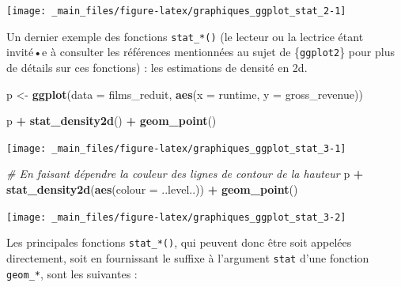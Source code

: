 \documentclass[
  11pt,
]{book}
\newenvironment{Shaded}{\begin{snugshade}}{\end{snugshade}}
\newcommand{\CommentTok}[1]{\textcolor[rgb]{0.56,0.35,0.01}{\textit{#1}}}
\newcommand{\DataTypeTok}[1]{\textcolor[rgb]{0.13,0.29,0.53}{#1}}
\newcommand{\KeywordTok}[1]{\textcolor[rgb]{0.13,0.29,0.53}{\textbf{#1}}}
\newcommand{\NormalTok}[1]{#1}
\newcommand{\OperatorTok}[1]{\textcolor[rgb]{0.81,0.36,0.00}{\textbf{#1}}}
\newcommand{\StringTok}[1]{\textcolor[rgb]{0.31,0.60,0.02}{#1}}
\numberwithin{equation}{section}
\numberwithin{countremarque}{section}
\begin{document}
\begin{center}\texttt{[image: \_main\_files/figure-latex/graphiques\_ggplot\_stat\_2-1]} \end{center}

Un dernier exemple des fonctions \texttt{stat\_*()} (le lecteur ou la lectrice étant invité•e à consulter les références mentionnées au sujet de \{\texttt{ggplot2}\} pour plus de détails sur ces fonctions) : les estimations de densité en 2d.

\begin{Shaded}
\begin{Highlighting}[]
\NormalTok{p \textless{}{-}}\StringTok{ }\KeywordTok{ggplot}\NormalTok{(}\DataTypeTok{data =}\NormalTok{ films\_reduit, }\KeywordTok{aes}\NormalTok{(}\DataTypeTok{x =}\NormalTok{ runtime, }\DataTypeTok{y =}\NormalTok{ gross\_revenue))}

\NormalTok{p }\OperatorTok{+}\StringTok{ }\KeywordTok{stat\_density2d}\NormalTok{() }\OperatorTok{+}\StringTok{ }\KeywordTok{geom\_point}\NormalTok{()}
\end{Highlighting}
\end{Shaded}

\begin{center}\texttt{[image: \_main\_files/figure-latex/graphiques\_ggplot\_stat\_3-1]} \end{center}

\begin{Shaded}
\begin{Highlighting}[]
\CommentTok{\# En faisant dépendre la couleur des lignes de contour de la hauteur}
\NormalTok{p }\OperatorTok{+}\StringTok{ }\KeywordTok{stat\_density2d}\NormalTok{(}\KeywordTok{aes}\NormalTok{(}\DataTypeTok{colour =}\NormalTok{ ..level..)) }\OperatorTok{+}\StringTok{ }\KeywordTok{geom\_point}\NormalTok{()}
\end{Highlighting}
\end{Shaded}

\begin{center}\texttt{[image: \_main\_files/figure-latex/graphiques\_ggplot\_stat\_3-2]} \end{center}

Les principales fonctions \texttt{stat\_*()}, qui peuvent donc être soit appelées directement, soit en fournissant le suffixe à l'argument \texttt{stat} d'une fonction \texttt{geom\_*}, sont les suivantes :
\end{document}
